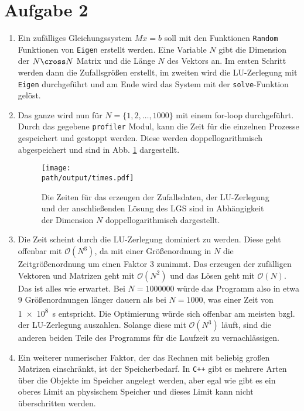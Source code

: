\section*{Aufgabe 2}

\begin{enumerate}[label=\alph*)]
    \item Ein zufälliges Gleichungssystem $Mx = b$ soll mit den Funktionen \texttt{Random} Funktionen von \texttt{Eigen} erstellt werden. 
    Eine Variable $N$ gibt die Dimension der $N \cross N$ Matrix und die Länge $N$ des Vektors an.
    Im ersten Schritt werden dann die Zufallsgrößen erstellt, im zweiten wird die LU-Zerlegung mit \texttt{Eigen} durchgeführt und am Ende wird das System mit der \texttt{solve}-Funktion gelöst.
    \item Das ganze wird nun für $N = \{1, 2, \dots, 1000\}$ mit einem for-loop durchgeführt. Durch das gegebene \texttt{profiler} Modul, kann die Zeit für die einzelnen Prozesse gespeichert und gestoppt werden. 
    Diese werden doppellogarithmisch abgespeichert und sind in Abb. \ref{fig:times} dargestellt.

    \begin{figure}
        \centering
        \texttt{[image: \\path/output/times.pdf]}
        \caption{Die Zeiten für das erzeugen der Zufallsdaten, der LU-Zerlegung und der anschließenden Lösung des LGS sind in Abhängigkeit der Dimension $N$ doppellogarithmisch dargestellt.}
        \label{fig:times}
    \end{figure}
    \item Die Zeit scheint durch die LU-Zerlegung dominiert zu werden. Diese geht offenbar mit $\mathcal{O}(N^3)$, da mit einer Größenordnung in $N$ die Zeitgrößenordnung um einen Faktor \num{3} zunimmt. Das erzeugen der zufälligen Vektoren und Matrizen geht mit $\mathcal{O}(N^2)$ und das Lösen geht mit $\mathcal{O}(N)$. Das ist alles wie erwartet.
    Bei $N = \num{1000000}$ würde das Programm also in etwa \num{9} Größenordnungen länger dauern als bei $N=\num{1000}$, was einer Zeit von \SI{1e8}{\second} entspricht. 
    Die Optimierung würde sich offenbar am meisten bzgl. der LU-Zerlegung auszahlen. Solange diese mit $\mathcal{O}(N^3)$ läuft, sind die anderen beiden Teile des Programms für die Laufzeit zu vernachlässigen.
    \item Ein weiterer numerischer Faktor, der das Rechnen mit beliebig großen Matrizen einschränkt, ist der Speicherbedarf. In \texttt{C++} gibt es mehrere Arten über die Objekte im Speicher angelegt werden, aber egal wie gibt es ein oberes Limit an physischem Speicher und dieses Limit kann nicht überschritten werden.
\end{enumerate}